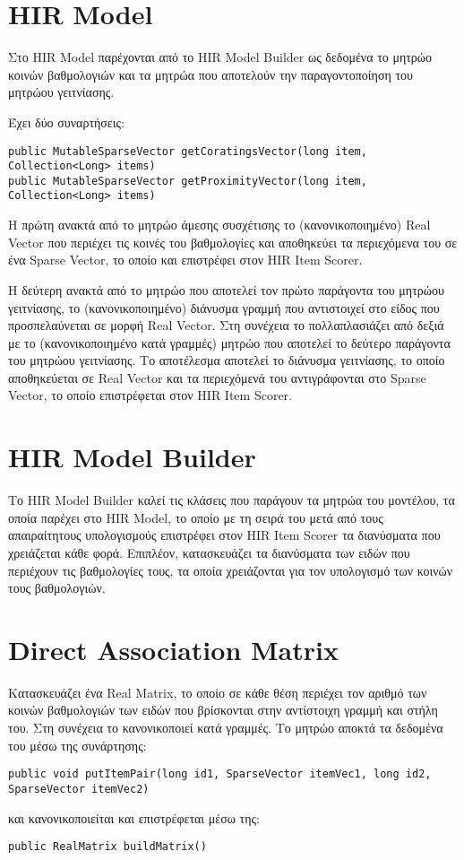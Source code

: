 \section{\en HIR Model}
Στο {\en HIR Model} παρέχονται από το {\en HIR Model Builder} ως δεδομένα το μητρώο κοινών βαθμολογιών και τα μητρώα που αποτελούν την παραγοντοποίηση του μητρώου γειτνίασης. \par
Έχει δύο συναρτήσεις:
\begin{scriptsize}
\en \begin{verbatim}
public MutableSparseVector getCoratingsVector(long item, Collection<Long> items) 
public MutableSparseVector getProximityVector(long item, Collection<Long> items)
\end{verbatim}
\end{scriptsize}
\el Η πρώτη ανακτά από το μητρώο άμεσης συσχέτισης το (κανονικοποιημένο) {\en Real Vector} που περιέχει τις κοινές του βαθμολογίες και αποθηκεύει τα περιεχόμενα του σε ένα {\en Sparse Vector}, το οποίο και επιστρέφει στον {\en HIR Item Scorer}.\par
Η δεύτερη ανακτά από το μητρώο που αποτελεί τον πρώτο παράγοντα του μητρώου γειτνίασης, το (κανονικοποιημένο) διάνυσμα γραμμή που αντιστοιχεί στο είδος που προσπελαύνεται σε μορφή {\en Real Vector}. Στη συνέχεια το πολλαπλασιά\-ζει από δεξιά με το (κανονικοποιημένο κατά γραμμές) μητρώο που αποτελεί το δεύτερο παράγοντα του μητρώου γειτνίασης. Το αποτέλεσμα αποτελεί το διάνυσμα γειτνίασης, το οποίο αποθηκεύεται σε {\en Real Vector} και τα περιεχόμενά του αντιγράφονται στο {\en Sparse Vector}, το οποίο επιστρέφεται στον {\en HIR Item Scorer}.
\section{\en HIR Model Builder}
Το {\en HIR Model Builder} καλεί τις κλάσεις που παράγουν τα μητρώα του μοντέ\-λου, τα οποία παρέχει στο {\en HIR Model}, το οποίο με τη σειρά του μετά από τους απαιραίτητους υπολογισμούς επιστρέφει στον {\en HIR Item Scorer} τα διανύσματα που χρειάζεται κάθε φορά. Επιπλέον, κατασκευάζει τα διανύσματα των ειδών που περιέχουν τις βαθμολογίες τους, τα οποία χρειάζονται για τον υπολογισμό των κοινών τους βαθμολογιών. 
\section{\en Direct Association Matrix}
Κατασκευάζει ένα {\en Real Matrix}, το οποίο σε κάθε θέση περιέχει τον αριθμό των κοινών βαθμολογιών των ειδών που βρίσκονται στην αντίστοιχη γραμμή και στήλη του. Στη συνέχεια το κανονικοποιεί κατά γραμμές. Το μητρώο αποκτά τα δεδομένα του μέσω της συνάρτησης:
\en \begin{scriptsize}
\begin{verbatim}
public void putItemPair(long id1, SparseVector itemVec1, long id2, SparseVector itemVec2)
\end{verbatim}
\end{scriptsize}
\el και κανονικοποιείται και επιστρέφεται μέσω της:
\en \begin{scriptsize}
\begin{verbatim}
public RealMatrix buildMatrix()
\end{verbatim}
\end{scriptsize}
